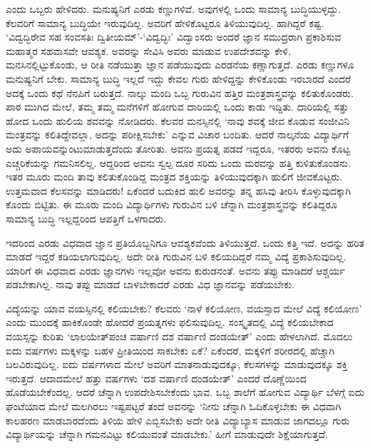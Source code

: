 ಎಂದು ಒಬ್ಬರು ಹೇಳಿದರು. 
ಮನುಷ್ಯನಿಗೆ ಎರಡು 
ಕಣ್ಣುಗಳಿವೆ. ಅವುಗಳಲ್ಲಿ 
ಒಂದು ಸಾಮಾನ್ಯ 
ಬುದ್ಧಿಯುಳ್ಳದ್ದು. ಕೆಲವರಿಗೆ 
ಸಾಮಾನ್ಯ ಬುದ್ಧಿಯೇ 
ಇರುವುದಿಲ್ಲ. ಅವರಿಗೆ 
ಹೇಳಿಕೊಟ್ಟರೂ 
ತಿಳಿಯುವುದಿಲ್ಲ. ಹಾಗಿದ್ದರೆ 
ಕಷ್ಟ. `ವಿದ್ವದ್ಭಿರೇವ ಸಹ 
ಸಂವಸತಿಃ 
ದ್ವಿತೀಯಮ್'-`ವಿದ್ವದ್ಭಿಃ' 
ವಿದ್ವಾಂಸರು ಅಂದರೆ ಜ್ಞಾನ 
ಸಮುದ್ರರಾಗಿ ಪ್ರಕಾಶಿಸುವ 
ಮಹಾತ್ಮರ ಸಹವಾಸವೇ ಆವಶ್ಯಕ. 
ಅವರನ್ನು ಸೇವಿಸಿ ಅವರು ಮಾಡುವ 
ಉಪದೇಶವನ್ನು ಕೇಳಿ, 
ಮನಸಿನಲ್ಲಿಟ್ಟುಕೊಂಡು, ಆ 
ರೀತಿ ನಡೆಯುತ್ತಾ ಜ್ಞಾನ 
ಪಡೆಯುವುದು ಎರಡನೆಯ 
ಕಣ್ಣಾಗುತ್ತದೆ. ಎರಡು 
ಕಣ್ಣುಗಳೂ ಮನುಷ್ಯನಿಗೆ ಬೇಕು. 
ಸಾಮಾನ್ಯ ಬುದ್ಧಿ ಇಲ್ಲದೆ 
ಇದ್ದು ಕೇವಲ ಗುರು 
ಹೇಳಿದ್ದನ್ನು ಕೇಳಿಕೊಂಡು 
ಇರಬಾರದೆ ಎಂದರೆ ಅದಕ್ಕೆ ಒಂದು 
ಕಥೆ ನೆನಪಿಗೆ ಬರುತ್ತದೆ. 
ನಾಲ್ಕು ಮಂದಿ ಒಬ್ಬ ಗುರುವಿನ 
ಹತ್ತಿರ ಮಂತ್ರಶಾಸ್ತ್ರವನ್ನು 
ಕಲಿತುಕೊಂಡರು. ಪಾಠ ಮುಗಿದ 
ಮೇಲೆ, ತಮ್ಮ ತಮ್ಮ ಮನೆಗಳಿಗೆ 
ಹೋಗುವ ದಾರಿಯಲ್ಲಿ ಒಂದು ಕಾಡು 
ಇದ್ದಿತು. ದಾರಿಯಲ್ಲಿ ಸತ್ತು 
ಹೋದ ಒಂದು ಹುಲಿಯ ಶವವನ್ನು 
ನೋಡಿದರು. ಕೆಲವರ 
ಮನಸ್ಸಿನಲ್ಲಿ `ನಾವು ಶವಕ್ಕೆ 
ಜೀವ ಕೊಡುವ ಸಂಜೀವಿನಿ 
ಮಂತ್ರವನ್ನು 
ಕಲಿತಿದ್ದೇವಲ್ಲಾ, ಅದನ್ನು 
ಪರೀಕ್ಷಿಸಬೇಕು' ಎನ್ನುವ 
ವಿಚಾರ ಬಂದಿತು. ಆದರೆ 
ನಾಲ್ಕನೆಯ ವಿದ್ಯಾರ್ಥಿಗೆ ಅದು 
ಅಪಾಯವನ್ನುಂಟುಮಾಡುತ್ತದೆಂದು ತೋರಿತು. ಅವನು ಪ್ರಯತ್ನ ಪಡದೆ ಇದ್ದರೂ, ಇತರರು ಅವನು ಕೊಟ್ಟ ಎಚ್ಚರಿಕೆಯನ್ನು ಗಮನಿಸಲಿಲ್ಲ. ಆದ್ದರಿಂದ ಅವನು ಸ್ವಲ್ಪ ದೂರ ಸರಿದು ಒಂದು ಮರವನ್ನು ಹತ್ತಿ ಕುಳಿತುಕೊಂಡನು. ಇತರ ಮೂರು ಮಂದಿ ತಾವು ಕಲಿತುಕೊಂಡಿದ್ದ ಮಂತ್ರದ ಶಕ್ತಿಯನ್ನು ತಿಳಿಯುವುದಕ್ಕಾಗಿ ಹುಲಿಗೆ ಜೀವಕೊಟ್ಟರು. ಉತ್ತಮವಾದ ಕೆಲಸವನ್ನು ಮಾಡಿದರು! ಏಕೆಂದರೆ ಬದುಕಿದ ಹುಲಿ ಅವರನ್ನು ತನ್ನ ಹಸಿವು ತೀರಿಸಿ ಕೊಳ್ಳುವುದಕ್ಕಾಗಿ ಕೊಂದು ಬಿಟ್ಟಿತು. ಈ ಮೂರು ಮಂದಿ ವಿದ್ಯಾರ್ಥಿಗಳು ಗುರುವಿನ ಬಳಿ ಚೆನ್ನಾಗಿ ಮಂತ್ರಶಾಸ್ತ್ರವನ್ನು ಕಲಿತಿದ್ದರೂ ಸಾಮಾನ್ಯ ಬುದ್ಧಿ ಇಲ್ಲದ್ದರಿಂದ ಆಪತ್ತಿಗೆ ಒಳಗಾದರು. 

ಇದರಿಂದ ಎರಡು ವಿಧವಾದ ಜ್ಞಾನ 
ಪ್ರತಿಯೊಬ್ಬನಿಗೂ 
ಆವಶ್ಯಕವೆಂದು ತಿಳಿಯುತ್ತದೆ. 
ಒಂದು ಕತ್ತಿ ಇದೆ. ಅದನ್ನು 
ಹರಿತ ಮಾಡದೆ ಇದ್ದರೆ 
ಕಡಿಯಲಾಗುವುದಿಲ್ಲ. ಅದೇ ರೀತಿ 
ಗುರುವಿನ ಬಳಿ ಕಲಿಯದಿದ್ದರೆ 
ನಮ್ಮ ವಿದ್ಯೆ 
ಪ್ರಕಾಶಿಸುವುದಿಲ್ಲ. ಯಾರಿಗೆ 
ಈ ವಿಧವಾದ ಎರಡು ಜ್ಞಾನಗಳು 
ಇಲ್ಲವೋ ಅವನು ಕುರುಡನಂತೆ. 
ಅವನು ತಪ್ಪು ಮಾಡಿದರೆ 
ಆಶ್ಚರ್ಯ ಪಡಬೇಕಾಗಿಲ್ಲ. ನಾವು 
ತಪ್ಪು ಮಾಡದೆ ಬಾಳಬೇಕಾದರೆ ಎರಡು ವಿಧ ಜ್ಞಾನವನ್ನು ಪಡೆಯಬೇಕು.

ವಿದ್ಯೆಯನ್ನು ಯಾವ 
ವಯಸ್ಸಿನಲ್ಲಿ ಕಲಿಯಬೇಕು? 
ಕೆಲವರು `ನಾಳೆ ಕಲಿಯೋಣ, 
ವಯಸ್ಸಾದ ಮೇಲೆ ವಿದ್ಯೆ 
ಕಲಿಯೋಣ' ಎಂದು ಮುಂದಕ್ಕೆ 
ಹಾಕಿಕೊಂಡೇ ಹೋದರೆ 
ಪ್ರಯತ್ನಗಳು ಫಲಿಸುವುದಿಲ್ಲ. 
ಸಂಸ್ಕೃತದಲ್ಲಿ ವಿದ್ಯೆ 
ಕಲಿಯಬೇಕಾದ ವಯಸ್ಸನ್ನು 
ಕುರಿತು `ಲಾಲಯೇತ್‌ಪಂಚ 
ವರ್ಷಾಣಿ ದಶ ವರ್ಷಾಣಿ 
ದಂಡಯೇತ್' ಎಂದು ಹೇಳಲಾಗಿದೆ. 
ಮೊದಲು ಐದು ವರ್ಷಗಳು 
ಮಕ್ಕಳನ್ನು ಬಹಳ ಪ್ರೀತಿಯಿಂದ 
ಸಾಕಬೇಕು ಏಕೆ? ಏಕೆಂದರೆ, 
ಮಕ್ಕಳಿಗೆ ಶರೀರದಲ್ಲಿ 
ಹೆಚ್ಚಾಗಿ ಬಲವಿರುವುದಿಲ್ಲ. 
ಐದು ವರ್ಷಗಳಾದ ಮೇಲೆ ಅವರಿಗೆ 
ಮಾತನಾಡುವುದಕ್ಕೂ, 
ಕೆಲಸಗಳನ್ನು ಮಾಡುವುದಕ್ಕೂ 
ಶಕ್ತಿ ಇರುತ್ತದೆ. ಆದಾದಮೇಲೆ 
ಹತ್ತು ವರ್ಷಗಳು `ದಶ ವರ್ಷಾಣಿ 
ದಂಡಯೇತ್' ಎಂದರೆ ದೊಣ್ಣೆಯಿಂದ 
ಹೊಡೆಯಬೇಕೆಂದಲ್ಲ. ಆದರೆ 
ಚೆನ್ನಾಗಿ ಉಪದೇಶಿಸಬೇಕೆಂದು 
ಭಾವ. ಒಬ್ಬ ಶಾಲೆಗೆ ಹೋಗುವ 
ವಿದ್ಯಾರ್ಥಿ ಬೆಳಗ್ಗೆ ಐದು 
ಘಂಟೆಯಾದ ಮೇಲೆ ಮಲಗಿರಲು 
ಇಷ್ಟಪಟ್ಟರೆ ತಂದೆ ಅವನನ್ನು 
`ನೀನು ಚೆನ್ನಾಗಿ 
ಓದಿಕೊಳ್ಳಬೇಕು ಈ ವಿಧವಾಗಿ 
ಕಾಲಹರಣ ಮಾಡಬಾರದೆಂದು ತಿಳಿಯ 
ಹೇಳಿ ಎಬ್ಬಿಸಬೇಕು ಅದೇ ರೀತಿ 
ವಿದ್ಯಾಬ್ಯಾಸ ಮಾಡುವ 
ಜಾಗದಲ್ಲೂ ಗುರು 
ವಿದ್ಯಾರ್ಥಿಯನ್ನು ಚೆನ್ನಾಗಿ 
ಗಮನವಿಟ್ಟು ಕಲಿಯುವಂತೆ ಮಾಡಬೇಕು.' ಹೀಗೆ ಮಾಡುವುದೇ ಶಿಕ್ಷೆಯಾಗುತ್ತದೆ.    

